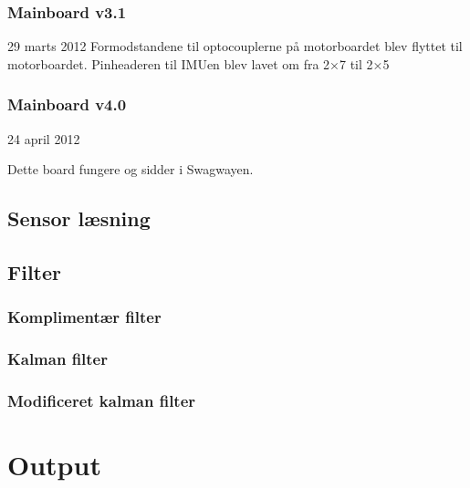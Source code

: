 \documentclass[a4paper,oneside,article,danish,table,draft]{memoir}
\newcommand{\boarddate}[1]{\textcolor{blue!80!black}{#1}}
\begin{document}
\subsubsection{Mainboard v3.1}
\boarddate{29 marts 2012}
Formodstandene til optocouplerne på motorboardet blev flyttet til motorboardet.
Pinheaderen til IMUen blev lavet om fra 2×7 til 2×5

\subsubsection{Mainboard v4.0}
\boarddate{24 april 2012}

Dette board fungere og sidder i Swagwayen.

\subsection{Sensor læsning}

\subsection{Filter}
\subsubsection{Komplimentær filter}
\subsubsection{Kalman filter}
\subsubsection{Modificeret kalman filter}

\section{Output}
\end{document}
